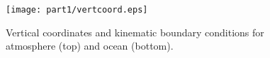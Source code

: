 \begin{figure}
  \begin{center}
   \texttt{[image: part1/vertcoord.eps]}
  \end{center}
\caption{Vertical coordinates and kinematic boundary conditions
for atmosphere (top) and ocean (bottom).}
\label{fig:zandp-vert-coord}
\end{figure}
